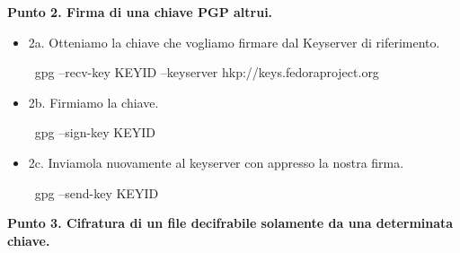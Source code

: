 {\bfseries\centering  Punto 2. Firma di una chiave PGP altrui.}\\

\begin{itemize}
 \item 2a. Otteniamo la chiave che vogliamo firmare dal Keyserver di riferimento.\\
\begin{shaded}
{\color[cmyk]{0, 0, 0, 0}\textdollar\ gpg --recv-key KEYID --keyserver hkp://keys.fedoraproject.org}\\
\end{shaded}
\item 2b. Firmiamo la chiave.\\
\begin{shaded}
{\color[cmyk]{0, 0, 0, 0}\textdollar\ gpg --sign-key KEYID}\\
\end{shaded}
\item 2c. Inviamola nuovamente al keyserver con appresso la nostra firma.\\
\begin{shaded}
{\color[cmyk]{0, 0, 0, 0}\textdollar\ gpg --send-key KEYID}\\
\end{shaded}
\end{itemize}

{\bfseries\centering Punto 3. Cifratura di un file decifrabile solamente da una determinata chiave.}\\

